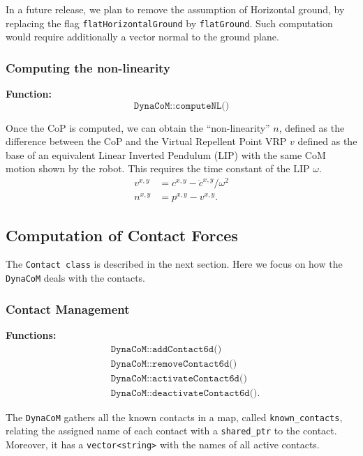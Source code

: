 \documentclass[12pt]{article}
\begin{document}
In a future release, we plan to remove the assumption of Horizontal ground, by replacing the flag \texttt{flatHorizontalGround} by \texttt{flatGround}. Such computation would require additionally a vector normal to the ground plane.

\subsubsection{Computing the non-linearity}

{\bf Function:}
\begin{equation*}
    \texttt{DynaCoM::computeNL()}
\end{equation*}

Once the CoP is computed, we can obtain the ``non-linearity'' $n$, defined as the difference between the CoP and the Virtual Repellent Point VRP $v$ defined as the base of an equivalent Linear Inverted Pendulum (LIP) with the same CoM motion shown by the robot. This requires the time constant of the LIP $ \omega $.
%
\begin{align}
    v^{x,y} &= c^{x,y} - \ddot{c}^{x,y}/\omega^2\\
    n^{x,y} &= p^{x,y} - v^{x,y}.
\end{align}

\clearpage
\newpage

\subsection{Computation of Contact Forces}
\hrulefill

The \texttt{Contact class} is described in the next section. Here we focus on how the \texttt{DynaCoM} deals with the contacts.

\subsubsection{Contact Management}

{\bf Functions:}
\begin{align*}
    &\texttt{DynaCoM::addContact6d()}\\
    &\texttt{DynaCoM::removeContact6d()}\\
    &\texttt{DynaCoM::activateContact6d()}\\
    &\texttt{DynaCoM::deactivateContact6d()}.
\end{align*}

The \texttt{DynaCoM} gathers all the known contacts in a map, called \texttt{known\_contacts}, relating the assigned name of each contact with a \texttt{shared\_ptr} to the contact. Moreover, it has a \texttt{vector<string>} with the names of all active contacts.
\end{document}
